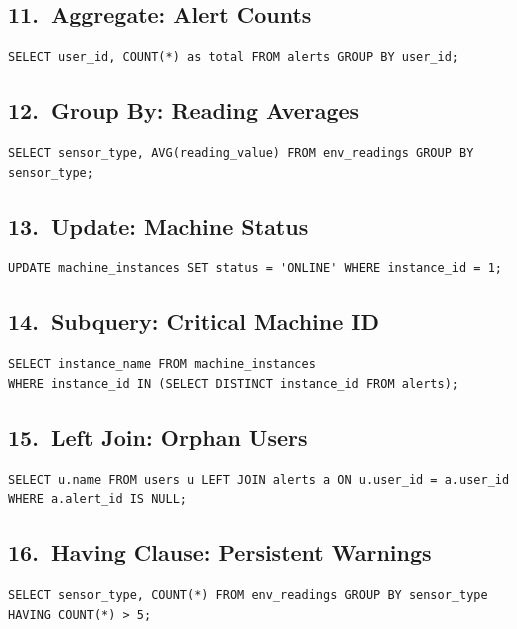 \documentclass[12pt, a4paper]{article}
\begin{document}
\subsection{11.\ Aggregate: Alert Counts}
\begin{lstlisting}
SELECT user_id, COUNT(*) as total FROM alerts GROUP BY user_id;
\end{lstlisting}

\subsection{12.\ Group By: Reading Averages}
\begin{lstlisting}
SELECT sensor_type, AVG(reading_value) FROM env_readings GROUP BY sensor_type;
\end{lstlisting}

\subsection{13.\ Update: Machine Status}
\begin{lstlisting}
UPDATE machine_instances SET status = 'ONLINE' WHERE instance_id = 1;
\end{lstlisting}

\subsection{14.\ Subquery: Critical Machine ID}
\begin{lstlisting}
SELECT instance_name FROM machine_instances 
WHERE instance_id IN (SELECT DISTINCT instance_id FROM alerts);
\end{lstlisting}

\subsection{15.\ Left Join: Orphan Users}
\begin{lstlisting}
SELECT u.name FROM users u LEFT JOIN alerts a ON u.user_id = a.user_id
WHERE a.alert_id IS NULL;
\end{lstlisting}

\subsection{16.\ Having Clause: Persistent Warnings}
\begin{lstlisting}
SELECT sensor_type, COUNT(*) FROM env_readings GROUP BY sensor_type HAVING COUNT(*) > 5;
\end{lstlisting}
\end{document}
